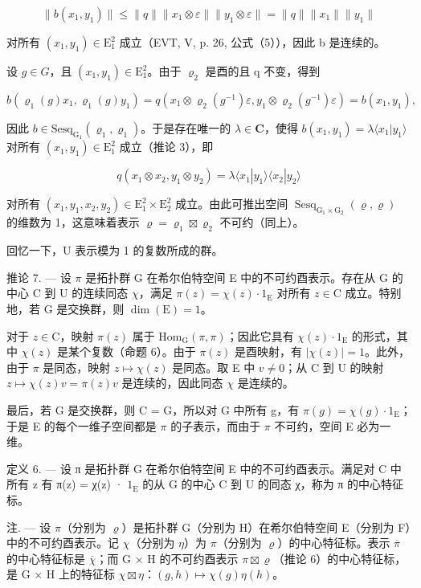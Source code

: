 \[
\| b (x _ {1}, y _ {1}) \| \leqslant \| q \| \| x _ {1} \otimes \varepsilon \| \| y _ {1} \otimes \varepsilon \| = \| q \| \| x _ {1} \| \| y _ {1} \|
\]

对所有 \((x_{1},y_{1})\in\mathrm{E}_{1}^{2}\) 成立（EVT, V, p. 26, 公式（5）），因此 b 是连续的。

设 \(g \in G\)，且 \((x_{1}, y_{1}) \in \mathrm{E}_{1}^{2}\)。由于 \(\varrho_{2}\) 是酉的且 q 不变，得到

\[
b \left(\varrho_ {1} (g) x _ {1}, \varrho_ {1} (g) y _ {1}\right) = q \left(x _ {1} \otimes \varrho_ {2} \left(g ^ {- 1}\right) \varepsilon , y _ {1} \otimes \varrho_ {2} \left(g ^ {- 1}\right) \varepsilon\right) = b \left(x _ {1}, y _ {1}\right),
\]

因此 \(b \in \mathrm{Sesq}_{\mathrm{G}_1}(\varrho_1, \varrho_1)\)。于是存在唯一的 \(\lambda \in \mathbf{C}\)，使得 \(b(x_1, y_1) = \lambda \langle x_1 | y_1 \rangle\) 对所有 \((x_1, y_1) \in \mathrm{E}_1^2\) 成立（推论 3），即

\[
q (x _ {1} \otimes x _ {2}, y _ {1} \otimes y _ {2}) = \lambda \langle x _ {1} | y _ {1} \rangle \langle x _ {2} | y _ {2} \rangle
\]

对所有 \((x_{1},y_{1},x_{2},y_{2})\in\mathrm{E}_{1}^{2}\times\mathrm{E}_{2}^{2}\) 成立。由此可推出空间 \(\operatorname{Sesq}_{\mathrm{G}_{1}\times\mathrm{G}_{2}}(\varrho,\varrho)\) 的维数为 1，这意味着表示 \(\varrho=\varrho_{1}\boxtimes\varrho_{2}\) 不可约（同上）。

回忆一下，U 表示模为 1 的复数所成的群。

推论 7. --- 设 \(\pi\) 是拓扑群 G 在希尔伯特空间 E 中的不可约酉表示。存在从 G 的中心 C 到 U 的连续同态 \(\chi\)，满足 \(\pi(z) = \chi(z) \cdot 1_{\mathrm{E}}\) 对所有 \(z \in \mathrm{C}\) 成立。特别地，若 G 是交换群，则 \(\dim(\mathrm{E}) = 1\)。

对于 \(z \in \mathrm{C}\)，映射 \(\pi(z)\) 属于 \(\mathrm{Hom}_{\mathrm{G}}(\pi, \pi)\)；因此它具有 \(\chi(z) \cdot 1_{\mathrm{E}}\) 的形式，其中 \(\chi(z)\) 是某个复数（命题 6）。由于 \(\pi(z)\) 是酉映射，有 \(|\chi(z)| = 1\)。此外，由于 \(\pi\) 是同态，映射 \(z \mapsto \chi(z)\) 是同态。取 E 中 \(v \neq 0\)；从 C 到 U 的映射 \(z \mapsto \chi(z)v = \pi(z)v\) 是连续的，因此同态 \(\chi\) 是连续的。

最后，若 G 是交换群，则 C = G，所以对 G 中所有 g，有 \(\pi(g) = \chi(g) \cdot 1_{\mathrm{E}}\)；于是 E 的每个一维子空间都是 \(\pi\) 的子表示，而由于 \(\pi\) 不可约，空间 E 必为一维。

定义 6. --- 设 π 是拓扑群 G 在希尔伯特空间 E 中的不可约酉表示。满足对 C 中所有 z 有 π(z) = χ(z) · \(1_{\mathrm{E}}\) 的从 G 的中心 C 到 U 的同态 χ，称为 π 的中心特征标。

注. --- 设 \(\pi\)（分别为 \(\varrho\)）是拓扑群 G（分别为 H）在希尔伯特空间 E（分别为 F）中的不可约酉表示。记 \(\chi\)（分别为 \(\eta\)）为 \(\pi\)（分别为 \(\varrho\)）的中心特征标。表示 \(\overline{\pi}\) 的中心特征标是 \(\overline{\chi}\)；而 G × H 的不可约酉表示 \(\pi \boxtimes \varrho\)（推论 6）的中心特征标，是 G × H 上的特征标 \(\chi \boxtimes \eta\)：\((g, h) \mapsto \chi(g)\eta(h)\)。

